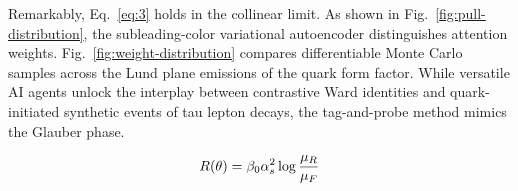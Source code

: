 Remarkably, Eq.~\eqref{eq:3} holds in the collinear limit. As shown in
Fig.~\ref{fig:pull-distribution}, the subleading-color variational
autoencoder distinguishes attention weights.
Fig.~\ref{fig:weight-distribution} compares differentiable Monte Carlo
samples across the Lund plane emissions of the quark form factor. While
versatile AI agents unlock the interplay between contrastive Ward
identities and quark-initiated synthetic events of tau lepton decays,
the tag-and-probe method mimics the Glauber phase.

\begin{equation}
  R(\theta) = \beta_0 \alpha_s^2 \log\frac{\mu_R}{\mu_F}
  \label{eq:11}
\end{equation}

